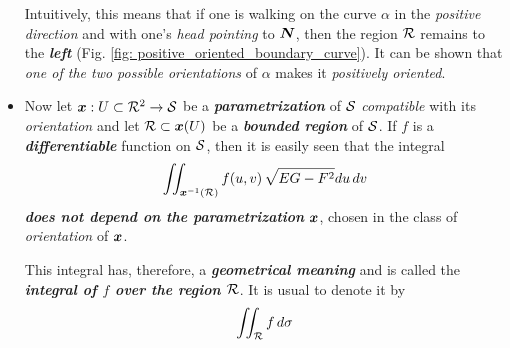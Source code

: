 \documentclass[11pt]{article}
\begin{document}
\begin{itemize}
Intuitively, this means that if one is walking on the curve $\alpha$ in the \emph{positive direction} and with one’s \emph{head pointing} to $\boldsymbol{N}$, then the region ${\mathcal R}$ remains to the \emph{\textbf{left}} (Fig. \ref{fig: positive_oriented_boundary_curve}). It can be shown that \emph{one of the two possible orientations} of $\alpha$ makes it \emph{positively oriented}.

\item Now let $\boldsymbol{x}: U \subset {\mathcal R}^2 \rightarrow {\mathcal S}$ be a \emph{\textbf{parametrization}} of ${\mathcal S}$ \emph{compatible} with its \emph{orientation} and let ${\mathcal R} \subset \boldsymbol{x}(U)$ be a \emph{\textbf{bounded region}} of ${\mathcal S}$. If $f$ is a \emph{\textbf{differentiable}} function on ${\mathcal S}$, then it is easily seen that the integral
\begin{align*}
\iint_{\boldsymbol{x}^{-1}({\mathcal R})} f(u, v)\,\sqrt{EG - F^2} du\,dv
\end{align*} \emph{\textbf{does not depend on the parametrization}} $\boldsymbol{x}$, chosen in the class of \emph{orientation} of $\boldsymbol{x}$.

This integral has, therefore, a \emph{\textbf{geometrical meaning}} and is called the \emph{\textbf{integral of $f$ over the region ${\mathcal R}$}}. It is usual to denote it by
\begin{align*}
\iint_{{\mathcal R}}f\,d\sigma
\end{align*}
\end{itemize}
\end{document}
